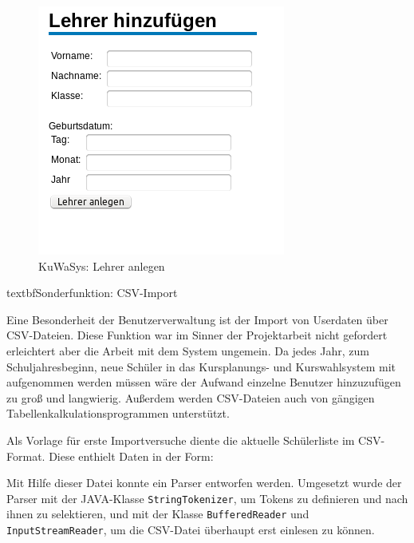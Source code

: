\begin{figure}[H]
 \begin{center}
   \includegraphics[scale=0.6]{img/LehrerAnlegen_KuWaSys.png}
 \end{center}
 \caption[\textbf{KuWaSys: Lehrer anlegen}]{KuWaSys: Lehrer anlegen}
 \label{fig:LehrerAnlegen_KuWaSys}
\end{figure}

textbf{Sonderfunktion: CSV-Import}

Eine Besonderheit der Benutzerverwaltung ist der Import von Userdaten über \ac{CSV}-Dateien. Diese Funktion war im Sinner der Projektarbeit nicht gefordert erleichtert aber die Arbeit mit dem System ungemein. Da jedes Jahr, zum Schuljahresbeginn, neue Schüler in das Kursplanungs- und Kurswahlsystem mit aufgenommen werden müssen wäre der Aufwand einzelne Benutzer hinzuzufügen zu groß und langwierig. Außerdem werden CSV-Dateien auch von gängigen Tabellenkalkulationsprogrammen unterstützt.

Als Vorlage für erste Importversuche diente die aktuelle Schülerliste im CSV-Format. Diese enthielt Daten in der Form:
	

Mit Hilfe dieser Datei konnte ein Parser entworfen werden. Umgesetzt wurde der Parser mit der JAVA-Klasse \texttt{StringTokenizer}, um Tokens zu definieren und nach ihnen zu selektieren, und mit der Klasse \texttt{BufferedReader} und \texttt{InputStreamReader}, um die CSV-Datei überhaupt erst einlesen zu können. 

